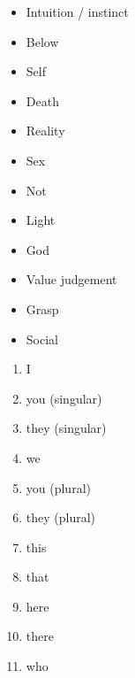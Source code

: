 \documentclass[a5,landscape]{article}
\begin{document}
{\begin{multicols}{4}
\begin{itemize}
\item   Intuition / instinct 

\item   Below 

\item   Self 

\item   Death 

\item   Reality 

\item   Sex 

\item   Not 

\item   Light 

\item   God 

\item   Value judgement  

\item   Grasp 

\item   Social  
\end{itemize}
\end{multicols}


\begin{multicols}{4}
\begin{enumerate}
\item   I 

\item   you (singular) 

\item   they (singular) 

\item   we 

\item   you (plural) 

\item   they (plural) 

\item   this 

\item   that 

\item   here 

\item   there 

\item   who 


\end{enumerate}
\end{multicols}}
\end{document}
